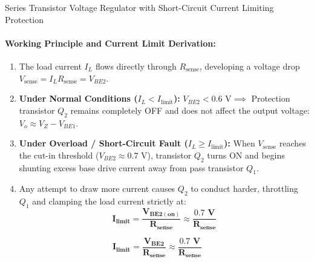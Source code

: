 \documentclass[11pt,a4paper,oneside]{book}
\begin{document}
\begin{schematicbox}{Series Transistor Voltage Regulator with Short-Circuit Current Limiting Protection}
\end{schematicbox}

\paragraph{Working Principle and Current Limit Derivation:}
\begin{enumerate}[leftmargin=1.5em]
  \item The load current $I_L$ flows directly through $R_{\text{sense}}$, developing a voltage drop $V_{\text{sense}} = I_L R_{\text{sense}} = V_{BE2}$.
  \item \textbf{Under Normal Conditions ($I_L < I_{\text{limit}}$):}
  $V_{BE2} < 0.6\text{ V} \implies$ Protection transistor $Q_2$ remains completely OFF and does not affect the output voltage: $V_o \approx V_Z - V_{BE1}$.
  \item \textbf{Under Overload / Short-Circuit Fault ($I_L \ge I_{\text{limit}}$):}
  When $V_{\text{sense}}$ reaches the cut-in threshold ($V_{BE2} \approx 0.7\text{ V}$), transistor $Q_2$ turns ON and begins shunting excess base drive current away from pass transistor $Q_1$.
  \item Any attempt to draw more current causes $Q_2$ to conduct harder, throttling $Q_1$ and clamping the load current strictly at:
  \[
  \mathbf{I_{\text{limit}} = \frac{V_{BE2(\text{on})}}{R_{\text{sense}}} \approx \frac{0.7\text{ V}}{R_{\text{sense}}}}
  \]
\end{enumerate}

\begin{answerbox}
$$\mathbf{I_{\text{limit}} = \frac{V_{BE2}}{R_{\text{sense}}} \approx \frac{0.7\text{ V}}{R_{\text{sense}}}}$$
\end{answerbox}
\end{document}
